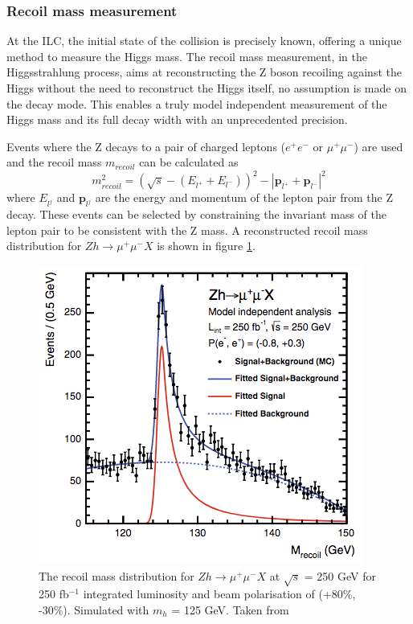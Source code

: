 \subsubsection{Recoil mass measurement}

At the ILC, the initial state of the collision is precisely known, offering a unique method to measure the Higgs mass. The recoil mass measurement, in the Higgsstrahlung process, aims at reconstructing the Z boson recoiling against the Higgs without the need to reconstruct the Higgs itself, no assumption is made on the decay mode. This enables a truly model independent measurement of the Higgs mass and its full decay width with an unprecedented precision.

Events where the Z decays to a pair of charged leptons ($e^+e^-$ or $\mu^+ \mu^-$) are used and the recoil mass $m_{recoil}$ can be calculated as \cite{Yan:2016xyx}
\begin{equation}
  m_{recoil}^2 = (\sqrt{s} - (E_{l^+} + E_{l^-}))^2 -  |\textbf{p}_{l^+} + \textbf{p}_{l^-}|^2
\end{equation}
where $E_{l^j}$ and $\textbf{p}_{l^j}$ are the energy and momentum of the lepton pair from the Z decay. These events can be selected by constraining the invariant mass of the lepton pair to be consistent with the Z mass. A reconstructed recoil mass distribution for $Zh \rightarrow \mu^+\mu^-X$ is shown in figure \ref{fig:HiggsRecoilMuMu}.

\begin{figure}[htbp!]
  \centering
  \includegraphics[width=0.5\linewidth]{chap2/fig/HiggsRecoilMuMu.png}
  \caption{The recoil mass distribution for $Zh \rightarrow \mu^+\mu^-X$ at $\sqrt{s}$ = 250 GeV for 250 fb$^{-1}$ integrated luminosity and beam polarisation of (+80\%, -30\%). Simulated with $m_h$ = 125 GeV. Taken from \cite{Thomson2016}} \label{fig:HiggsRecoilMuMu}
\end{figure}

